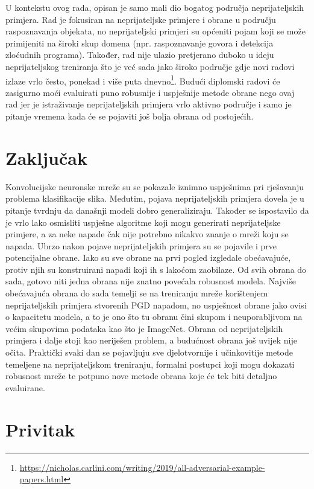 \documentclass[utf8, diplomski]{fer}
\begin{document}
U kontekstu ovog rada, opisan je samo mali dio bogatog područja neprijateljskih primjera. Rad je fokusiran na neprijateljske primjere i obrane u području raspoznavanja objekata, no neprijateljski primjeri su općeniti pojam koji se može primijeniti na široki skup domena (npr. raspoznavanje govora i detekcija zloćudnih programa). Također, rad nije ulazio pretjerano duboko u ideju neprijateljskog treniranja što je već sada jako široko područje gdje novi radovi izlaze vrlo često, ponekad i više puta dnevno\footnote{\url{https://nicholas.carlini.com/writing/2019/all-adversarial-example-papers.html}}. Budući diplomski radovi će zasigurno moći evaluirati puno robusnije i uspješnije metode obrane nego ovaj rad jer je istraživanje neprijateljskih primjera vrlo aktivno područje i samo je pitanje vremena kada će se pojaviti još bolja obrana od postojećih. 

\chapter{Zaključak}
Konvolucijske neuronske mreže su se pokazale iznimno uspješnima pri rješavanju problema klasifikacije slika. Međutim, pojava neprijateljskih primjera dovela je u pitanje tvrdnju da današnji modeli dobro generaliziraju. Također se ispostavilo da je vrlo lako osmisliti uspješne algoritme koji mogu generirati neprijateljske primjere, a za neke napade čak nije potrebno nikakvo znanje o mreži koju se napada. Ubrzo nakon pojave neprijateljskih primjera su se pojavile i prve potencijalne obrane. Iako su sve obrane na prvi pogled izgledale obećavajuće, protiv njih su konstruirani napadi koji ih s lakoćom zaobilaze. Od svih obrana do sada, gotovo niti jedna obrana nije znatno povećala robusnost modela. Najviše obećavajuća obrana do sada temelji se na treniranju mreže korištenjem neprijateljskih primjera stvorenih PGD napadom, no uspješnost obrane jako ovisi o kapacitetu modela, a to je ono što tu obranu čini skupom i neuporabljivom na većim skupovima podataka kao što je ImageNet. Obrana od neprijateljskih primjera i dalje stoji kao neriješen problem, a budućnost obrana još uvijek nije očita. Praktički svaki dan se pojavljuju sve djelotvornije i učinkovitije metode temeljene na neprijateljskom treniranju, formalni postupci koji mogu dokazati robusnost mreže te potpuno nove metode obrana koje će tek biti detaljno evaluirane. 





\chapter{Privitak}\label{dodatak}
\end{document}
